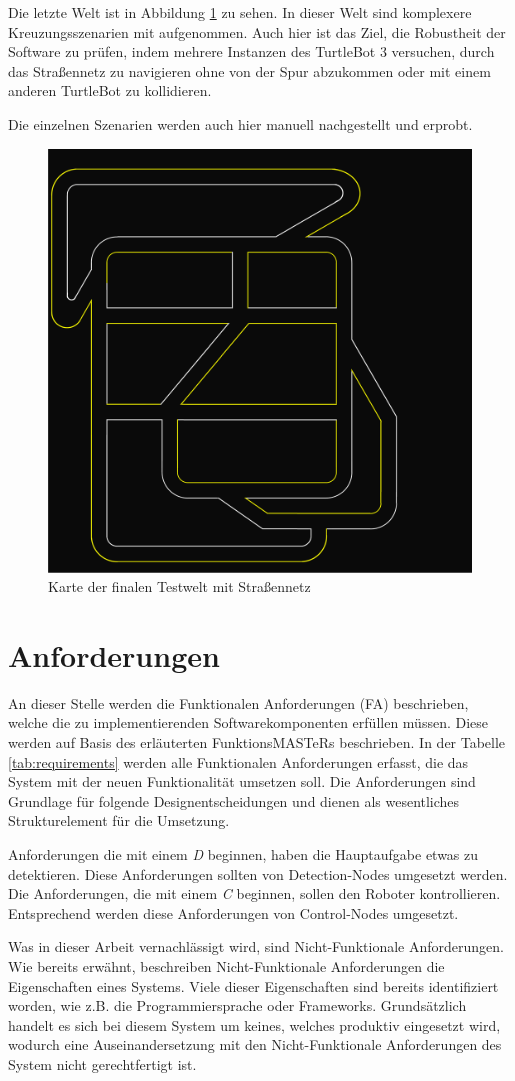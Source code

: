   Die letzte Welt ist in Abbildung \ref{fig:Testworld_Final_Map} zu sehen. In dieser Welt sind komplexere Kreuzungsszenarien mit aufgenommen. Auch hier ist das Ziel, die Robustheit der Software zu prüfen, 
  indem mehrere Instanzen des TurtleBot 3 versuchen, durch das Straßennetz zu navigieren ohne von der Spur abzukommen oder mit einem anderen TurtleBot zu kollidieren.

  Die einzelnen Szenarien werden auch hier manuell nachgestellt und erprobt.

\begin{figure}[h!]
  \centering
  \includegraphics[height=0.5\textwidth]{images/road_final_map.png}
  \caption{Karte der finalen Testwelt mit Straßennetz}
  \label{fig:Testworld_Final_Map}
\end{figure}


\section{Anforderungen}
An dieser Stelle werden die Funktionalen Anforderungen (FA) beschrieben, welche die zu implementierenden Softwarekomponenten erfüllen müssen. Diese werden auf Basis des erläuterten
FunktionsMASTeRs beschrieben. In der Tabelle \ref{tab:requirements} werden alle Funktionalen Anforderungen erfasst, die das System mit der neuen Funktionalität umsetzen soll.
Die Anforderungen sind Grundlage für folgende Designentscheidungen und dienen als wesentliches Strukturelement für die Umsetzung.

Anforderungen die mit einem \textit{D} beginnen, haben die Hauptaufgabe etwas zu detektieren. Diese Anforderungen sollten von Detection-Nodes umgesetzt werden. Die Anforderungen, die mit
einem \textit{C} beginnen, sollen den Roboter kontrollieren. Entsprechend werden diese Anforderungen von Control-Nodes umgesetzt. 

Was in dieser Arbeit vernachlässigt wird, sind Nicht-Funktionale Anforderungen. Wie bereits erwähnt, beschreiben Nicht-Funktionale Anforderungen die Eigenschaften eines Systems.
Viele dieser Eigenschaften sind bereits identifiziert worden, wie z.B. die Programmiersprache oder Frameworks. Grundsätzlich handelt es sich bei diesem System um keines, welches produktiv
eingesetzt wird, wodurch eine Auseinandersetzung mit den Nicht-Funktionale Anforderungen des System nicht gerechtfertigt ist.


